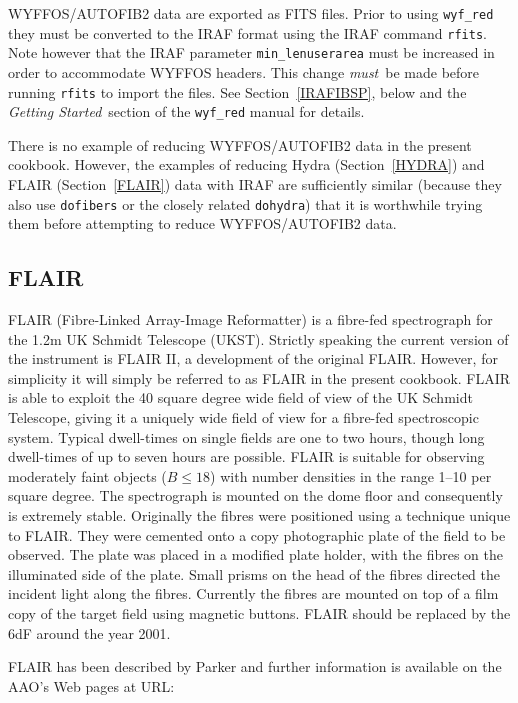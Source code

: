 \documentclass[chapters,twoside,11pt]{starlink}
\begin{document}
WYFFOS/AUTOFIB2 data are exported as FITS files.  Prior to using
\texttt{wyf\_red} they must be converted to the IRAF format using the
IRAF command \texttt{rfits}.  Note however that the IRAF parameter \texttt{min\_lenuserarea} must be increased in order to accommodate WYFFOS
headers.  This change \textit{must}\, be made before running \texttt{rfits}
to import the files.  See Section~\ref{IRAFIBSP}, below and the \textit{Getting Started}\, section of the  \texttt{wyf\_red} manual for details.

There is no example of reducing WYFFOS/AUTOFIB2 data in the present
cookbook.  However, the examples of reducing Hydra (Section~\ref{HYDRA})
and FLAIR (Section~\ref{FLAIR}) data with IRAF are sufficiently similar
(because they also use \texttt{dofibers} or the closely related \texttt{dohydra}) that it is worthwhile trying them before attempting to reduce
WYFFOS/AUTOFIB2 data.

\subsection{\label{FLAIR_I}FLAIR}

FLAIR (Fibre-Linked Array-Image Reformatter) is a fibre-fed spectrograph
for the 1.2m UK Schmidt Telescope (UKST).  Strictly speaking the current
version of the instrument is FLAIR II, a development of the original
FLAIR.  However, for simplicity it will simply be referred to as FLAIR
in the present cookbook.  FLAIR is able to exploit the 40 square degree
wide field of view of the UK Schmidt Telescope, giving it a uniquely wide
field of view for a fibre-fed spectroscopic system.  Typical dwell-times on
single fields are one to two hours, though long dwell-times of up to seven
hours are possible.  FLAIR is suitable for observing moderately faint
objects ($B \leq 18$) with number densities in the range 1--10 per square
degree.  The spectrograph is mounted on the dome floor and consequently is
extremely stable.  Originally the fibres were positioned using a
technique unique to FLAIR.  They were cemented onto a copy photographic
plate of the field to be observed.  The plate was placed in a modified
plate holder, with the fibres on the illuminated side of the plate.  Small
prisms on the head of the fibres directed the incident light along the
fibres.  Currently the fibres are mounted on top of a film copy of the
target field using magnetic buttons.  FLAIR should be replaced by the
6dF\cite{PARKER98} around the year 2001.

FLAIR has been described by Parker\cite{PARKER97A} and further information
is available on the AAO's Web pages at URL:
\end{document}
